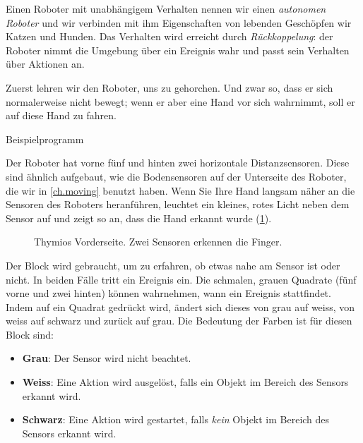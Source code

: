\label{ch.pet}

Einen Roboter mit unabhängigem Verhalten nennen wir einen \emph{autonomen Roboter} und wir verbinden mit ihm Eigenschaften von lebenden Geschöpfen wir Katzen und Hunden. Das Verhalten wird erreicht durch \textit{Rückkoppelung}: der Roboter nimmt die Umgebung über ein Ereignis wahr und passt sein Verhalten über Aktionen an.


Zuerst lehren wir den Roboter, uns zu gehorchen. Und zwar so, dass er sich normalerweise nicht bewegt; wenn er aber eine Hand vor sich wahrnimmt, soll er
auf diese Hand zu fahren.

{\raggedleft \hfill Beispielprogramm }

Der Roboter hat vorne fünf und hinten zwei horizontale Distanzsensoren.
Diese sind ähnlich aufgebaut, wie die Bodensensoren auf der Unterseite des Roboter, die wir in \cref{ch.moving} benutzt haben. Wenn Sie Ihre Hand langsam näher an die Sensoren des Roboters heranführen, leuchtet ein kleines, rotes
Licht neben dem Sensor auf und zeigt so an, dass die Hand erkannt wurde (\cref{fig.detect}).

\begin{figure}
\begin{center}
\caption{Thymios Vorderseite. Zwei Sensoren erkennen die Finger.}\label{fig.detect}
\end{center}
\end{figure}

Der Block  wird gebraucht, um zu erfahren, ob etwas nahe am Sensor ist oder nicht. In beiden Fälle tritt ein Ereignis ein. Die schmalen, grauen Quadrate (fünf vorne und zwei hinten) können wahrnehmen, wann ein Ereignis stattfindet. 
Indem auf ein Quadrat gedrückt wird, ändert sich dieses von grau auf weiss, 
von weiss auf schwarz und zurück auf grau.
Die Bedeutung der Farben ist für diesen Block sind:

\begin{itemize}
	\item \textbf{Grau}: Der Sensor wird nicht beachtet.
	\item \textbf{Weiss}: Eine Aktion wird ausgelöst, falls ein Objekt im Bereich des Sensors erkannt wird.
	\item \textbf{Schwarz}: Eine Aktion wird gestartet, falls \emph{kein} Objekt im Bereich des Sensors erkannt wird.
\end{itemize}

